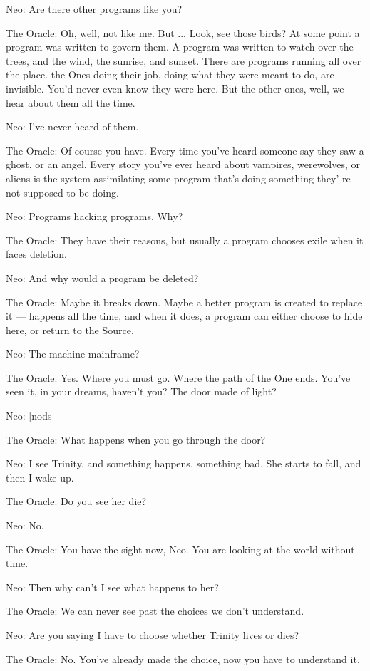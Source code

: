 \documentclass{ctexart}
\newenvironment{myquote}{\color{green} \setlength{\leftskip}{6em} \setlength{\rightskip}{4em} \setlength{\parindent}{-2em}}{\par}
\begin{document}
\begin{myquote}
Neo: Are there other programs like you?

The Oracle: Oh, well, not like me. But ... Look, see those birds? At some point a program was written to govern them. A program was written to watch over the trees, and the wind, the sunrise, and sunset. There are programs running all over the place. the Ones doing their job, doing what they were meant to do, are invisible. You'd never even know they were here. But the other ones, well, we hear about them all the time.

Neo: I've never heard of them.

The Oracle: Of course you have. Every time you've heard someone say they saw a ghost, or an angel. Every story you've ever heard about vampires, werewolves, or aliens is the system assimilating some program that's doing something they' re not supposed to be doing.

Neo: Programs hacking programs. Why?

The Oracle: They have their reasons, but usually a program chooses exile when it faces deletion.

Neo: And why would a program be deleted?

The Oracle: Maybe it breaks down. Maybe a better program is created to replace it --- happens all the time, and when it does, a program can either choose to hide here, or return to the Source.

Neo: The machine mainframe?

The Oracle: Yes. Where you must go. Where the path of the One ends. You've seen it, in your dreams, haven't you? The door made of light?

Neo: [nods]

The Oracle: What happens when you go through the door?

Neo: I see Trinity, and something happens, something bad. She starts to fall, and then I wake up.

The Oracle: Do you see her die?

Neo: No.

The Oracle: You have the sight now, Neo. You are looking at the world without time.

Neo: Then why can't I see what happens to her?

The Oracle: We can never see past the choices we don't understand.

Neo: Are you saying I have to choose whether Trinity lives or dies?

The Oracle: No. You've already made the choice, now you have to understand it.


\end{myquote}
\end{document}
